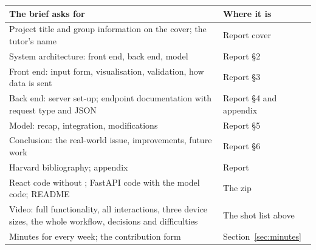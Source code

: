 \begin{center}
\small
\begin{tabularx}{\textwidth}{@{}Y L{5.6cm}@{}}
\toprule
\textbf{The brief asks for} & \textbf{Where it is} \\
\midrule
Project title and group information on the cover; the tutor's name & Report cover \\
System architecture: front end, back end, model & Report §2 \\
Front end: input form, visualisation, validation, how data is sent & Report §3 \\
Back end: server set-up; endpoint documentation with request type and JSON & Report §4 and appendix \\
Model: recap, integration, modifications & Report §5 \\
Conclusion: the real-world issue, improvements, future work & Report §6 \\
Harvard bibliography; appendix & Report \\
React code without ; FastAPI code with the model code; README & The zip \\
Video: full functionality, all interactions, three device sizes, the whole workflow, decisions and difficulties & The shot list above \\
Minutes for every week; the contribution form & Section~\ref{sec:minutes} \\
\bottomrule
\end{tabularx}
\end{center}
